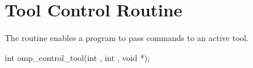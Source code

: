 %
%
%
%
%
%
%
%
%
%
%
%
%

\section{Tool Control Routine}
\label{sec:control_tool}

\summary
The  routine enables a program to
pass commands to an active tool.

\format
\begin{ccppspecific}
\begin{ompcFunction}
int omp_control_tool(int , int , void *);
\end{ompcFunction}
\end{ccppspecific}

